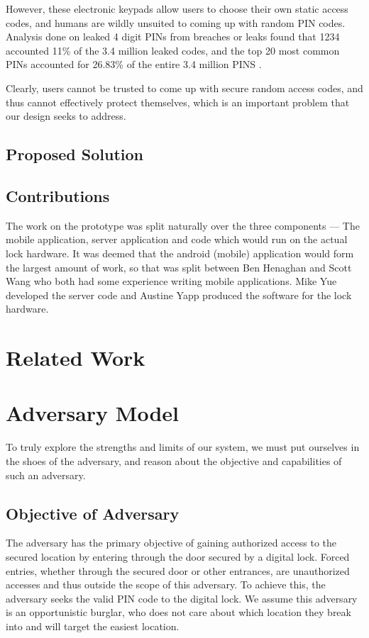 \documentclass[conference]{IEEEtran}
\begin{document}
	However, these electronic keypads allow users to choose their own static access codes, and humans are wildly unsuited to coming up with random PIN codes. Analysis done on leaked 4 digit PINs from breaches or leaks found that 1234 accounted 11\% of the 3.4 million leaked codes, and the top 20 most common PINs accounted for 26.83\% of the entire 3.4 million PINS \cite{b1}.
	
	Clearly, users cannot be trusted to come up with secure random access codes, and thus cannot effectively protect themselves, which is an important problem that our design seeks to address.


\subsection{Proposed Solution}

\subsection{Contributions}
The work on the prototype was split naturally over the three components --- The mobile application, server application and code which would run on the actual lock hardware.
It was deemed that the android (mobile) application would form the largest amount of work, so that was split between Ben Henaghan and Scott Wang who both had some experience writing mobile applications.
Mike Yue developed the server code and Austine Yapp produced the software for the lock hardware.

\section{Related Work}

\section{Adversary Model}
To truly explore the strengths and limits of our system, we must put ourselves in the shoes of the adversary, and reason about the objective and capabilities of such an adversary.
\subsection{Objective of Adversary}
The adversary has the primary objective of gaining authorized access to the secured location by entering through the door secured by a digital lock. Forced entries, whether through the secured door or other entrances, are unauthorized accesses and thus outside the scope of this adversary. To achieve this, the adversary seeks the valid PIN code to the digital lock. We assume this adversary is an opportunistic burglar, who does not care about which location they break into and will target the easiest location.
\end{document}
